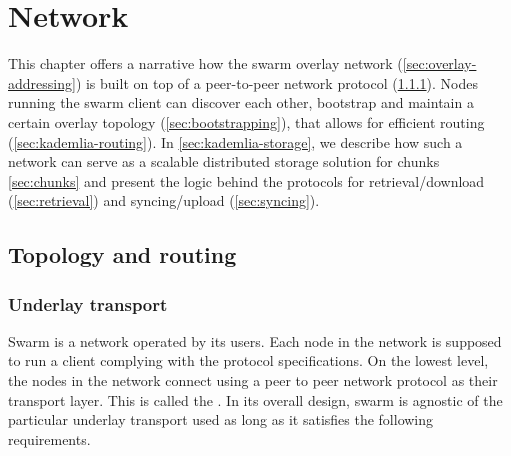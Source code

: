\chapter{Network}\label{sec:network}

This chapter offers a narrative how the swarm overlay network (\ref{sec:overlay-addressing}) is built on top of a peer-to-peer network protocol (\ref{sec:underlay-transport}). Nodes running the swarm client can discover each other, bootstrap and maintain a certain overlay topology (\ref{sec:bootstrapping}), that allows for efficient routing (\ref{sec:kademlia-routing}). In \ref{sec:kademlia-storage}, we describe how such a network can serve as a scalable distributed storage solution for chunks \ref{sec:chunks} and present the logic behind the protocols for retrieval/download (\ref{sec:retrieval}) and syncing/upload (\ref{sec:syncing}).

\section{Topology and routing}\label{sec:topology-routing}



\subsection{Underlay transport}\label{sec:underlay-transport} 

Swarm is a network operated by its users. Each node in the network is supposed to run a client complying with the protocol specifications. On the lowest level, the nodes in the network connect using a peer to peer network protocol as their transport layer. This is called the . 
In its overall design, swarm is agnostic of the particular underlay transport used as long as it satisfies the following requirements.

